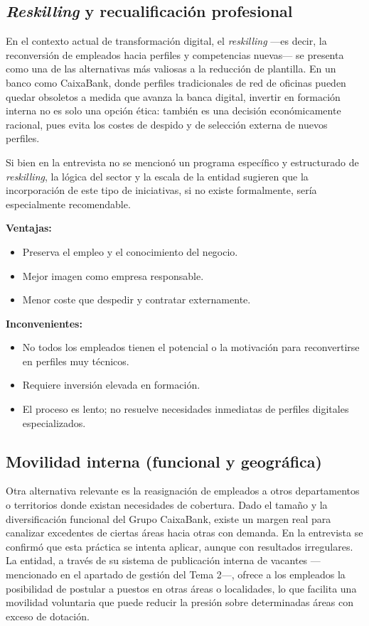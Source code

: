 \subsection{\textit{Reskilling} y recualificación profesional}

En el contexto actual de transformación digital, el \textit{reskilling}
---es decir, la reconversión de empleados hacia perfiles y competencias
nuevas--- se presenta como una de las alternativas más valiosas a la
reducción de plantilla. En un banco como CaixaBank, donde perfiles
tradicionales de red de oficinas pueden quedar obsoletos a medida que
avanza la banca digital, invertir en formación interna no es solo una
opción ética: también es una decisión económicamente racional, pues evita
los costes de despido y de selección externa de nuevos perfiles.

Si bien en la entrevista no se mencionó un programa específico y estructurado
de \textit{reskilling}, la lógica del sector y la escala de la entidad
sugieren que la incorporación de este tipo de iniciativas, si no existe
formalmente, sería especialmente recomendable.

\textbf{Ventajas:}
\begin{itemize}
  \item Preserva el empleo y el conocimiento del negocio.
  \item Mejor imagen como empresa responsable.
  \item Menor coste que despedir y contratar externamente.
\end{itemize}

\textbf{Inconvenientes:}
\begin{itemize}
  \item No todos los empleados tienen el potencial o la motivación para
        reconvertirse en perfiles muy técnicos.
  \item Requiere inversión elevada en formación.
  \item El proceso es lento; no resuelve necesidades inmediatas de
        perfiles digitales especializados.
\end{itemize}

\subsection{Movilidad interna (funcional y geográfica)}

Otra alternativa relevante es la reasignación de empleados a otros
departamentos o territorios donde existan necesidades de cobertura. Dado
el tamaño y la diversificación funcional del Grupo CaixaBank, existe un
margen real para canalizar excedentes de ciertas áreas hacia otras con
demanda. En la entrevista se confirmó que esta práctica se intenta aplicar,
aunque con resultados irregulares. La entidad, a través de su sistema
de publicación interna de vacantes ---mencionado en el apartado de gestión
del Tema 2---, ofrece a los empleados la posibilidad de postular a puestos
en otras áreas o localidades, lo que facilita una movilidad voluntaria
que puede reducir la presión sobre determinadas áreas con exceso de dotación.


